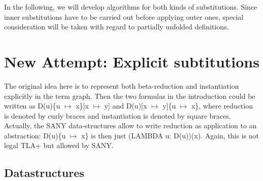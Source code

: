 \documentclass[a4paper]{article}
\newcommand{\tlaplus}[0]{{TLA+}}
\newcommand{\tla}[1]{#1}
\begin{document}
In the following, we will develop algorithms for both kinds of substitutions.
 Since inner substitutions have to be carried out before applying outer ones,
 special consideration will be taken with regard to partially unfolded
 definitions.

\section{New Attempt: Explicit subtitutions}

The original idea here is to represent both beta-reduction and instantiation
 explicitly in the term graph. Then the two formulas in the introduction
 could be written as D(u)\{u $\mapsto$ x\}[x $\mapsto$ y] and
 D(u)[x $\mapsto$ y]\{u $\mapsto$ x\}, where reduction is denoted by curly
 braces and instantiation is denoted by square braces. Actually, the SANY
 data-structures allow to write reduction as application to an abstraction:
 D(u)\{u $\mapsto$ x\} is then just \tla{(LAMBDA u: D(u))(x)}. Again, this
 is not legal \tlaplus{} but allowed by SANY.


\subsection{Datastructures}
\label{sec:ds}
\end{document}
